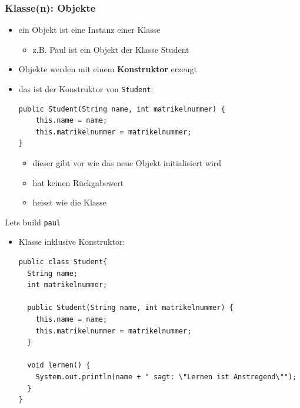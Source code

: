 \documentclass{../../presentation}
\begin{document}
\begin{frame}[fragile]
	\frametitle{Klasse(n): Objekte}
	\begin{itemize}
		\item ein Objekt ist eine Instanz einer Klasse
		      \begin{itemize}
			      \item[\textbullet] z.B. Paul ist ein Objekt der Klasse Student
		      \end{itemize}
		\item<2-> Objekte werden mit einem \textbf{Konstruktor} erzeugt
		\item<3-> das ist der Konstruktor von \texttt{Student}:
		      \begin{verbatim}
public Student(String name, int matrikelnummer) {
	this.name = name;
	this.matrikelnummer = matrikelnummer;
}
      \end{verbatim}
		      \begin{itemize}
			      \item<4->[\textbullet]dieser gibt vor wie das neue Objekt initialisiert wird
			      \item<5->[\textbullet]hat keinen Rückgabewert
			      \item<6->[\textbullet]heisst wie die Klasse
		      \end{itemize}
	\end{itemize}
\end{frame}

\begin{frame}[fragile]{Let\textquotesingle s build \texttt{paul}}
	\begin{itemize}
		\item Klasse inklusive Konstruktor:

		      \begin{verbatim}
public class Student{
  String name;
  int matrikelnummer;

  public Student(String name, int matrikelnummer) {
    this.name = name;
    this.matrikelnummer = matrikelnummer;
  }

  void lernen() {
    System.out.println(name + " sagt: \"Lernen ist Anstregend\"");
  }
}
  \end{verbatim}
	\end{itemize}
\end{frame}
\end{document}
